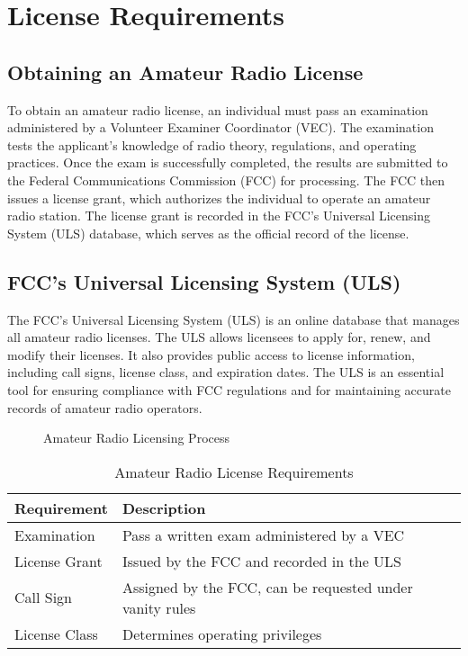 \section{License Requirements}
\label{sec:license_requirements}

\subsection*{Obtaining an Amateur Radio License}
To obtain an amateur radio license, an individual must pass an examination administered by a Volunteer Examiner Coordinator (VEC). The examination tests the applicant's knowledge of radio theory, regulations, and operating practices. Once the exam is successfully completed, the results are submitted to the Federal Communications Commission (FCC) for processing. The FCC then issues a license grant, which authorizes the individual to operate an amateur radio station. The license grant is recorded in the FCC's Universal Licensing System (ULS) database, which serves as the official record of the license.

\subsection*{FCC's Universal Licensing System (ULS)}
The FCC's Universal Licensing System (ULS) is an online database that manages all amateur radio licenses. The ULS allows licensees to apply for, renew, and modify their licenses. It also provides public access to license information, including call signs, license class, and expiration dates. The ULS is an essential tool for ensuring compliance with FCC regulations and for maintaining accurate records of amateur radio operators.

\begin{figure}[h]
    \centering
    \caption{Amateur Radio Licensing Process}
    \label{fig:licensing_process}
\end{figure}

\begin{table}[h]
    \centering
    \caption{Amateur Radio License Requirements}
    \label{tab:license_requirements}
    \begin{tabular}{|l|l|}
        \hline
        \textbf{Requirement} & \textbf{Description} \\
        \hline
        Examination & Pass a written exam administered by a VEC \\
        \hline
        License Grant & Issued by the FCC and recorded in the ULS \\
        \hline
        Call Sign & Assigned by the FCC, can be requested under vanity rules \\
        \hline
        License Class & Determines operating privileges \\
        \hline
    \end{tabular}
\end{table}

